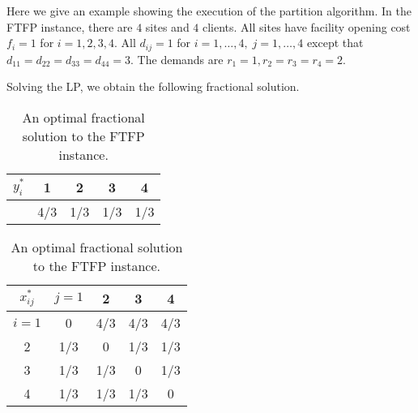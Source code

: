 \documentclass[11pt]{article}
\begin{document}
Here we give an example showing the execution of the
partition algorithm. In the FTFP instance, there are $4$
sites and $4$ clients. All sites have facility opening cost
$f_i=1$ for $i=1,2,3,4$. All $d_{ij}=1$ for $i=1,\ldots,4,\;
j=1,\ldots,4$ except that $d_{11} = d_{22} = d_{33} = d_{44}
= 3$. The demands are $r_1=1, r_2=r_3=r_4=2$.

Solving the LP, we obtain the following fractional solution.
\begin{table}[ht]
  \begin{subtable}{0.5\textwidth}
  \centering
  \begin{tabular}{c | c c c c}
    $y_i^\ast$ & 1 & 2 & 3 & 4\\
    \hline
    & 4/3 & 1/3 & 1/3 & 1/3\\
  \end{tabular}
  \subcaption{}
\end{subtable}
%
\begin{subtable}{0.5\textwidth}
  \centering
  \begin{tabular}{c | c c c c}
    $x_{ij}^\ast$ & $j=1$ & 2 & 3 & 4\\
    \hline
    $i=1$ & 0 & 4/3 & 4/3 & 4/3\\
    2 & 1/3 & 0 & 1/3 & 1/3\\
    3 & 1/3 & 1/3 & 0 & 1/3\\
    4 & 1/3 & 1/3 & 1/3 & 0\\
  \end{tabular}
  \subcaption{}
\end{subtable}
\caption{An optimal fractional solution to the FTFP instance.}
\end{table}
\end{document}
